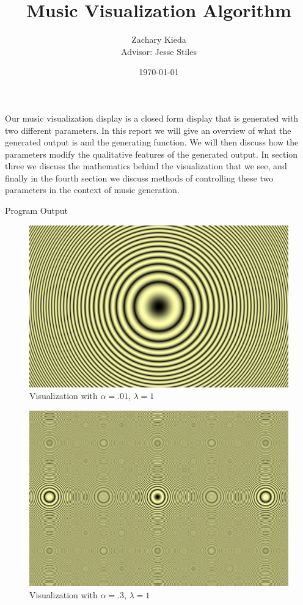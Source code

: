 \documentclass[11pt]{article}
\title{Music Visualization Algorithm}
\author{Zachary Kieda\\{Advisor: Jesse Stiles}}
\date{\today}
\begin{document}
\maketitle


Our music visualization display is a closed form display that is generated with two different parameters. In this report we will give an overview of what the generated output is and the generating function. We will then discuss how the parameters modify the qualitative features of the generated output. In section three we discuss the mathematics behind the visualization that we see, and finally in the fourth section we discuss methods of controlling these two parameters in the context of music generation. 

\begin{section}{Program Output}
\begin{figure}[h]
\centering
\includegraphics[width=.9\textwidth]{viz-small.png}
\caption{Visualization with $\alpha = .01$, $\lambda = 1$}
\label{fig:vizsmall}
\end{figure}

\begin{figure}[h]
\centering
\includegraphics[width=.9\textwidth]{viz-large.png}
\caption{Visualization with $\alpha = .3$, $\lambda = 1$}
\label{fig:vizlarge}
\end{figure}


\end{section}
\end{document}
